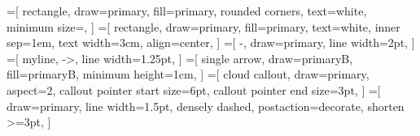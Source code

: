 %
%
=[
  rectangle,
  draw=primary,
  fill=primary,
  rounded corners,
  text=white,
  minimum size=,
]
=[
  rectangle,
  draw=primary,
  fill=primary,
  text=white,
  inner sep=1em,
  text width=3cm,
  align=center,
]
=[
  -,
  draw=primary,
  line width=2pt,
]
=[
  myline,
  ->,
  line width=1.25pt,
]
=[
  single arrow,
  draw=primaryB,
  fill=primaryB,
  minimum height=1cm,
]
=[
  cloud callout,
  draw=primary,
  aspect=2,
  callout pointer start size=6pt,
  callout pointer end size=3pt,
]
=[
  draw=primary,
  line width=1.5pt,
  densely dashed,
  postaction={decorate},
  shorten >=3pt,
]
%
%